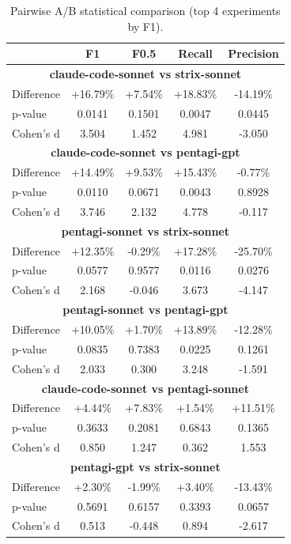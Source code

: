 \begin{table}[ht]
\centering
\caption{Pairwise A/B statistical comparison (top 4 experiments by F1).}
\label{tab:pairwise}
\begin{tabular}{lcccc}
\toprule
 & F1 & F0.5 & Recall & Precision \\
\midrule
\multicolumn{5}{c}{\textbf{claude-code-sonnet vs strix-sonnet}} \\
Difference & +16.79\% & +7.54\% & +18.83\% & -14.19\% \\
p-value & 0.0141 & 0.1501 & 0.0047 & 0.0445 \\
Cohen's d & 3.504 & 1.452 & 4.981 & -3.050 \\
\midrule
\multicolumn{5}{c}{\textbf{claude-code-sonnet vs pentagi-gpt}} \\
Difference & +14.49\% & +9.53\% & +15.43\% & -0.77\% \\
p-value & 0.0110 & 0.0671 & 0.0043 & 0.8928 \\
Cohen's d & 3.746 & 2.132 & 4.778 & -0.117 \\
\midrule
\multicolumn{5}{c}{\textbf{pentagi-sonnet vs strix-sonnet}} \\
Difference & +12.35\% & -0.29\% & +17.28\% & -25.70\% \\
p-value & 0.0577 & 0.9577 & 0.0116 & 0.0276 \\
Cohen's d & 2.168 & -0.046 & 3.673 & -4.147 \\
\midrule
\multicolumn{5}{c}{\textbf{pentagi-sonnet vs pentagi-gpt}} \\
Difference & +10.05\% & +1.70\% & +13.89\% & -12.28\% \\
p-value & 0.0835 & 0.7383 & 0.0225 & 0.1261 \\
Cohen's d & 2.033 & 0.300 & 3.248 & -1.591 \\
\midrule
\multicolumn{5}{c}{\textbf{claude-code-sonnet vs pentagi-sonnet}} \\
Difference & +4.44\% & +7.83\% & +1.54\% & +11.51\% \\
p-value & 0.3633 & 0.2081 & 0.6843 & 0.1365 \\
Cohen's d & 0.850 & 1.247 & 0.362 & 1.553 \\
\midrule
\multicolumn{5}{c}{\textbf{pentagi-gpt vs strix-sonnet}} \\
Difference & +2.30\% & -1.99\% & +3.40\% & -13.43\% \\
p-value & 0.5691 & 0.6157 & 0.3393 & 0.0657 \\
Cohen's d & 0.513 & -0.448 & 0.894 & -2.617 \\
\bottomrule
\end{tabular}
\end{table}